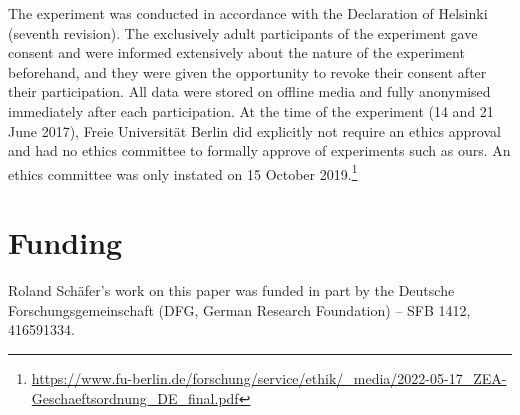 \documentclass[biblatex, charis, linguex]{glossa}\usepackage{knitr}
\begin{document}
The experiment was conducted in accordance with the Declaration of Hel\-sinki (seventh revision).
The exclusively adult participants of the experiment gave consent and were informed extensively about the nature of the experiment beforehand, and they were given the opportunity to revoke their consent after their participation.
All data were stored on offline media and fully anonymised immediately after each participation.
At the time of the experiment (14 and 21 June 2017), Freie Universität Berlin did explicitly not require an ethics approval and had no ethics committee to formally approve of experiments such as ours.
An ethics committee was only instated on 15 October 2019.\footnote{\url{https://www.fu-berlin.de/forschung/service/ethik/_media/2022-05-17_ZEA-Geschaeftsordnung_DE_final.pdf}}

\section{Funding}

Roland Schäfer's work on this paper was funded in part by the Deutsche Forschungsgemeinschaft (DFG, German Research Foundation) -- SFB 1412, 416591334.

\printbibliography
\end{document}
